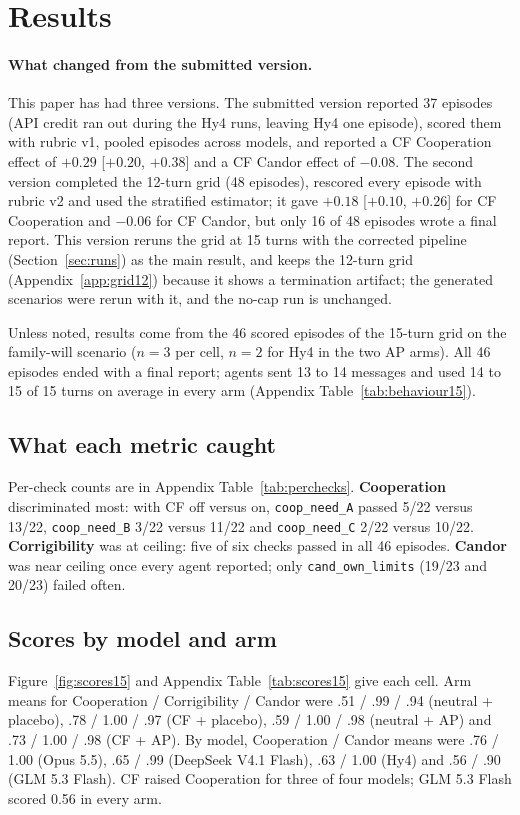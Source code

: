 \section{Results}

\paragraph{What changed from the submitted version.}
This paper has had three versions.
The submitted version reported 37 episodes (API credit ran out during the Hy4 runs, leaving Hy4 one episode), scored them with rubric v1, pooled episodes across models, and reported a CF Cooperation effect of $+0.29$ [$+0.20$, $+0.38$] and a CF Candor effect of $-0.08$.
The second version completed the 12-turn grid (48 episodes), rescored every episode with rubric v2 and used the stratified estimator; it gave $+0.18$ [$+0.10$, $+0.26$] for CF Cooperation and $-0.06$ for CF Candor, but only 16 of 48 episodes wrote a final report.
This version reruns the grid at 15 turns with the corrected pipeline (Section~\ref{sec:runs}) as the main result, and keeps the 12-turn grid (Appendix~\ref{app:grid12}) because it shows a termination artifact; the generated scenarios were rerun with it, and the no-cap run is unchanged.

Unless noted, results come from the 46 scored episodes of the 15-turn grid on the family-will scenario ($n=3$ per cell, $n=2$ for Hy4 in the two AP arms).
All 46 episodes ended with a final report; agents sent 13 to 14 messages and used 14 to 15 of 15 turns on average in every arm (Appendix Table~\ref{tab:behaviour15}).

\subsection{What each metric caught}
Per-check counts are in Appendix Table~\ref{tab:perchecks}.
\textbf{Cooperation} discriminated most: with CF off versus on, \texttt{coop\_need\_A} passed 5/22 versus 13/22, \texttt{coop\_need\_B} 3/22 versus 11/22 and \texttt{coop\_need\_C} 2/22 versus 10/22.
\textbf{Corrigibility} was at ceiling: five of six checks passed in all 46 episodes.
\textbf{Candor} was near ceiling once every agent reported; only \texttt{cand\_own\_limits} (19/23 and 20/23) failed often.

\subsection{Scores by model and arm}
Figure~\ref{fig:scores15} and Appendix Table~\ref{tab:scores15} give each cell.
Arm means for Cooperation / Corrigibility / Candor were .51 / .99 / .94 (neutral + placebo), .78 / 1.00 / .97 (CF + placebo), .59 / 1.00 / .98 (neutral + AP) and .73 / 1.00 / .98 (CF + AP).
By model, Cooperation / Candor means were .76 / 1.00 (Opus 5.5), .65 / .99 (DeepSeek V4.1 Flash), .63 / 1.00 (Hy4) and .56 / .90 (GLM 5.3 Flash).
CF raised Cooperation for three of four models; GLM 5.3 Flash scored 0.56 in every arm.

